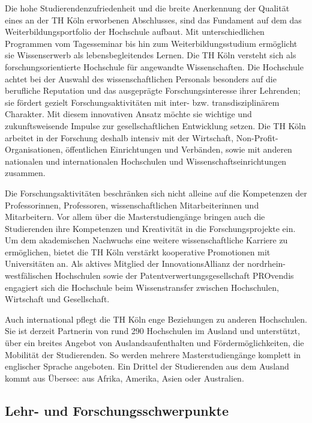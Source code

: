 Die hohe Studierendenzufriedenheit und die breite Anerkennung der
Qualität eines an der TH Köln erworbenen Abschlusses, sind das Fundament
auf dem das Weiterbildungsportfolio der Hochschule aufbaut. Mit
unterschiedlichen Programmen vom Tagesseminar bis hin zum
Weiterbildungsstudium ermöglicht sie Wissenserwerb als
lebensbegleitendes Lernen. Die TH Köln versteht sich als
forschungsorientierte Hochschule für angewandte Wissenschaften. Die
Hochschule achtet bei der Auswahl des wissenschaftlichen Personals
besonders auf die berufliche Reputation und das ausgeprägte
Forschungsinteresse ihrer Lehrenden; sie fördert gezielt
Forschungsaktivitäten mit inter- bzw. transdisziplinärem Charakter. Mit
diesem innovativen Ansatz möchte sie wichtige und zukunftsweisende
Impulse zur gesellschaftlichen Entwicklung setzen. Die TH Köln arbeitet
in der Forschung deshalb intensiv mit der Wirtschaft,
Non-Profit-Organisationen, öffentlichen Einrichtungen und Verbänden,
sowie mit anderen nationalen und internationalen Hochschulen und
Wissenschaftseinrichtungen zusammen.

Die Forschungsaktivitäten beschränken sich nicht alleine auf die
Kompetenzen der Professorinnen, Professoren, wissenschaftlichen
Mitarbeiterinnen und Mitarbeitern. Vor allem über die Masterstudiengänge
bringen auch die Studierenden ihre Kompetenzen und Kreativität in die
Forschungsprojekte ein. Um dem akademischen Nachwuchs eine weitere
wissenschaftliche Karriere zu ermöglichen, bietet die TH Köln verstärkt
kooperative Promotionen mit Universitäten an. Als aktives Mitglied der
InnovationsAllianz der nordrhein-westfälischen Hochschulen sowie der
Patentverwertungsgesellschaft PROvendis engagiert sich die Hochschule
beim Wissenstransfer zwischen Hochschulen, Wirtschaft und Gesellschaft.

Auch international pflegt die TH Köln enge Beziehungen zu anderen
Hochschulen. Sie ist derzeit Partnerin von rund 290 Hochschulen im
Ausland und unterstützt, über ein breites Angebot von
Auslandsaufenthalten und Fördermöglichkeiten, die Mobilität der
Studierenden. So werden mehrere Masterstudiengänge komplett in
englischer Sprache angeboten. Ein Drittel der Studierenden aus dem
Ausland kommt aus Übersee: aus Afrika, Amerika, Asien oder Australien.

\subsection{Lehr- und
Forschungsschwerpunkte\label{/mi-2017/selbstbericht/0040-einbettung-in-die-hochschule/0000-einbettung-in-die-hochschule}}\label{lehr--und-forschungsschwerpunktepathlabelmi-2017selbstbericht0040-einbettung-in-die-hochschule0000-einbettung-in-die-hochschule}

